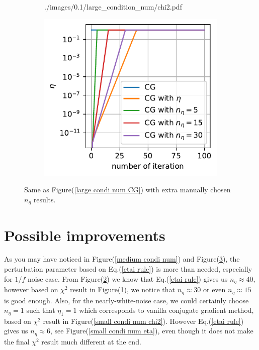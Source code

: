 \documentclass[11pt, letterpaper]{article}
\begin{document}
\begin{figure}[htb]
\begin{subfigure}{0.33\textwidth}
        {./images/0.1/large_condition_num/chi2.pdf}
    \caption{}
    \label{large condi num chi2}
\end{subfigure}%
\begin{subfigure}{0.33\textwidth}
    \centering
    \includegraphics[width=\linewidth]
        {./images/0.1/large_condition_num/eta.pdf}
    \caption{}
    \label{large condi num eta}
\end{subfigure}
\caption{Same as Figure(\ref{large condi num CG}) with extra manually chosen 
    $n_{\eta}$ results.
}
\label{large condi num}
\end{figure}

\section{Possible improvements}
As you may have noticed in Figure(\ref{medium condi num})
and Figure(\ref{large condi num}), the perturbation parameter based on
Eq.(\ref{etai rule}) is more than needed, especially for $1/f$ noise case.
From Figure(\ref{large condi num eta}) we know that Eq.(\ref{etai rule}) gives
us $n_{\eta}\approx40$, however based on $\chi^2$ result in 
Figure(\ref{large condi num chi2}), we notice that $n_{\eta}\approx30$ or 
even $n_{\eta} \approx 15$ is good enough.
Also, for the nearly-white-noise case, we could certainly choose $n_{\eta}=1$
such that $\eta_1=1$ which corresponds to vanilla conjugate gradient method,
based on $\chi^2$ result in Figure(\ref{small condi num chi2}).
However Eq.(\ref{etai rule}) gives us $n_{\eta} \approx 6$,
see Figure(\ref{small condi num eta}), even though it does not make the final 
$\chi^2$ result much different at the end.
\end{document}
